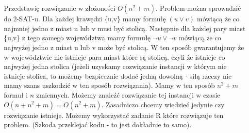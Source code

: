 \documentclass[a4paper,12pt]{article}
\begin{document}
\section{}
Przedstawię rozwiązanie w złożoności $O(n^2+m)$. Problem można sprowadzić do 2-SAT-u. Dla każdej krawędzi \{u,v\} mamy formułę $(u\vee{v})$ mówiącą że co najmniej jedno z miast u lub v musi być stolicą. Następnie dla każdej pary miast \{u,v\} z tego samego województwa mamy formułę $\neg{u}\vee{\neg{v}}$ mówiącą że co najwyżej jedno z miast u lub v może być stolicą. W ten sposób gwarantujemy że w województwie nie istnieje para miast które są stolicą, czyli że istnieje co najwyżej jedna stolica (jeżeli uzyskamy rozwiązanie instancji w którym nie istnieje stolica, to możemy bezpiecznie dodać jedną dowolną - siłą rzeczy nie mamy szans uszkodzić w ten sposób rozwiązania). Mamy w ten sposób $n^2+m$ formuł i $n$ zmiennych. Możemy znaleźć rozwiązanie tej instancji w czasie $O(n+n^2+m)=O(n^2+m)$. Zasadniczo chcemy wiedzieć jedynie czy rozwiązanie istnieje. Możemy wykorzystać zadanie R które rozwiązuje ten problem. (Szkoda przeklejać kodu - to jest dokładnie to samo).
\end{document}
